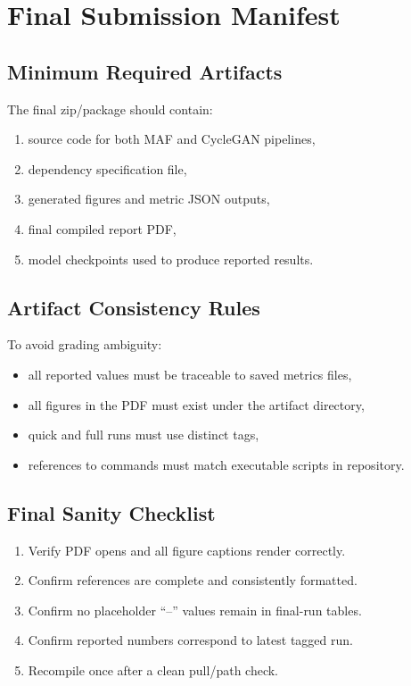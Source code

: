 \documentclass[conference]{IEEEtran}
\begin{document}
\section{Final Submission Manifest}
\subsection{Minimum Required Artifacts}
The final zip/package should contain:
\begin{enumerate}
\item source code for both MAF and CycleGAN pipelines,
\item dependency specification file,
\item generated figures and metric JSON outputs,
\item final compiled report PDF,
\item model checkpoints used to produce reported results.
\end{enumerate}

\subsection{Artifact Consistency Rules}
To avoid grading ambiguity:
\begin{itemize}
\item all reported values must be traceable to saved metrics files,
\item all figures in the PDF must exist under the artifact directory,
\item quick and full runs must use distinct tags,
\item references to commands must match executable scripts in repository.
\end{itemize}

\subsection{Final Sanity Checklist}
\begin{enumerate}
\item Verify PDF opens and all figure captions render correctly.
\item Confirm references are complete and consistently formatted.
\item Confirm no placeholder ``--'' values remain in final-run tables.
\item Confirm reported numbers correspond to latest tagged run.
\item Recompile once after a clean pull/path check.
\end{enumerate}
\end{document}
